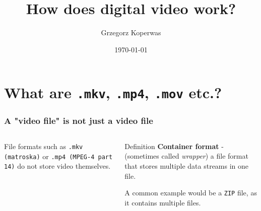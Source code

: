 \documentclass[aspectratio=169]{beamer}
\title[How do video files work?]{How does digital video work?}
\author{Grzegorz Koperwas}
\date{\today}
\begin{document}
\begin{frame}
    \titlepage
\end{frame}

\begin{frame}
    \tableofcontents
\end{frame}

\section{What are \texttt{.mkv}, \texttt{.mp4}, \texttt{.mov} etc.?}
\begin{frame}
    \frametitle{A "video file" is not just a video file}
    \begin{columns}
        \begin{column}{.5\textwidth}
            File formats such as \texttt{.mkv (matroska)} or \texttt{.mp4 (MPEG-4 part 14)} do not store video themselves.

            \pause
        \end{column}
        \begin{column}{.5\textwidth}
            \begin{block}{Definition}
                \textbf{Container format} - (sometimes called \emph{wrapper}) a file format that stores multiple data streams in one file.

                A common example would be a \texttt{ZIP} file, as it contains multiple files.
            \end{block}
        \end{column}
    \end{columns}
\end{frame}

%
\end{document}
